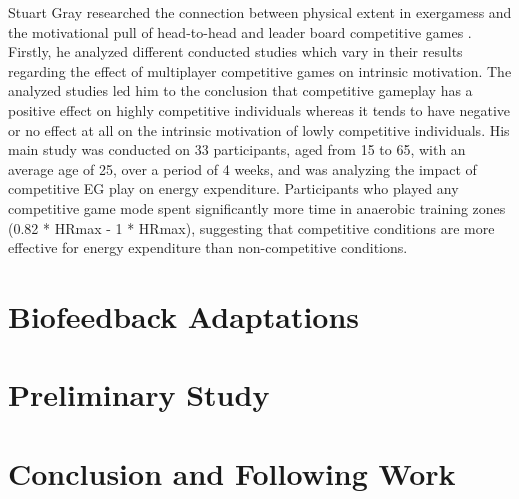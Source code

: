 \begin{multicols}{2}
Stuart Gray researched the connection between physical extent in exergamess and the motivational pull of head-to-head and leader board competitive games \cite{Gray2013}. Firstly, he analyzed different conducted studies which vary in their results regarding the effect of multiplayer competitive games on intrinsic motivation. The analyzed studies led him to the conclusion that competitive gameplay has a positive effect on highly competitive individuals whereas it tends to have negative or no effect at all on the intrinsic motivation of lowly competitive individuals. His main study was conducted on 33 participants, aged from 15 to 65, with an average age of 25, over a period of 4 weeks, and was analyzing the impact of competitive EG play on energy expenditure. Participants who played any competitive game mode spent significantly more time in anaerobic training zones (0.82 * HRmax - 1 * HRmax), suggesting that competitive conditions are more effective for energy expenditure than non-competitive conditions.


\section{Biofeedback Adaptations}

\section{Preliminary Study}

\section{Conclusion and Following Work}


\end{multicols}







